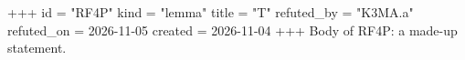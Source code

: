 +++
id = "RF4P"
kind = "lemma"
title = "T"
refuted_by = "K3MA.a"
refuted_on = 2026-11-05
created = 2026-11-04
+++
Body of RF4P: a made-up statement.
